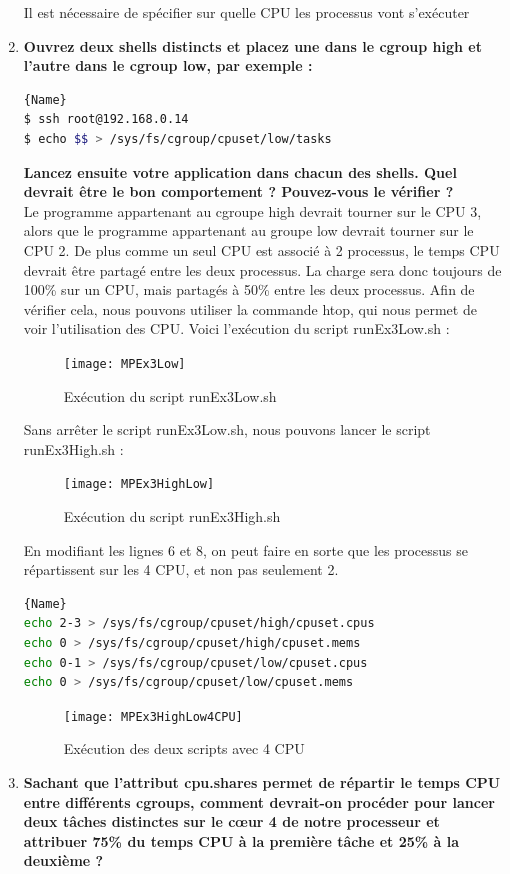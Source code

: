 \documentclass[
	a4paper, %
	10pt, %
]{CSUniSchoolLabReport}
\begin{document}
\begin{enumerate}[label=\textbf{\arabic*}]
	
	Il est n\'ecessaire de sp\'ecifier sur quelle CPU les processus vont s'ex\'ecuter
	\item \textbf{Ouvrez deux shells distincts et placez une dans le cgroup high et l’autre dans le cgroup low, par exemple :}\\
\begin{lstlisting}[language=bash, firstnumber=1]{Name}
$ ssh root@192.168.0.14
$ echo $$ > /sys/fs/cgroup/cpuset/low/tasks
\end{lstlisting}
\textbf{Lancez ensuite votre application dans chacun des shells. Quel devrait être le bon comportement ? Pouvez-vous le vérifier ?}\\
Le programme appartenant au cgroupe high devrait tourner sur le CPU 3, alors que le programme appartenant au groupe low devrait tourner sur le CPU 2.
De plus comme un seul CPU est associé \`a 2 processus, le temps CPU devrait \^etre partagé entre les deux processus. La charge sera donc toujours de 100\% sur un CPU, mais partagés \`a 50\% entre les deux processus.
Afin de v\'erifier cela, nous pouvons utiliser la commande htop, qui nous permet de voir l'utilisation des CPU.
Voici l'ex\'ecution du script runEx3Low.sh :
\begin{figure}[H]
	\centering
	\texttt{[image: MPEx3Low]}
	\caption{Ex\'ecution du script runEx3Low.sh}
	\label{fig:MPEx3Low}
\end{figure}
Sans arr\^eter le script runEx3Low.sh, nous pouvons lancer le script runEx3High.sh :
\begin{figure}[H]
	\centering
	\texttt{[image: MPEx3HighLow]}
	\caption{Ex\'ecution du script runEx3High.sh}
	\label{fig:MPEx3High}
\end{figure}

En modifiant les lignes 6 et 8, on peut faire en sorte que les processus se r\'epartissent sur les 4 CPU, et non pas seulement 2.
\begin{lstlisting}[language=bash, firstnumber=1]{Name}
echo 2-3 > /sys/fs/cgroup/cpuset/high/cpuset.cpus
echo 0 > /sys/fs/cgroup/cpuset/high/cpuset.mems
echo 0-1 > /sys/fs/cgroup/cpuset/low/cpuset.cpus
echo 0 > /sys/fs/cgroup/cpuset/low/cpuset.mems
\end{lstlisting}

\begin{figure}[H]
	\centering
	\texttt{[image: MPEx3HighLow4CPU]}
	\caption{Ex\'ecution des deux scripts avec 4 CPU}
	\label{fig:MPEx3HighLow4CPU}
\end{figure}


	\item \textbf{Sachant que l’attribut cpu.shares permet de répartir le temps CPU entre différents cgroups, comment devrait-on procéder pour lancer deux tâches distinctes sur le cœur 4 de notre processeur et attribuer 75\% du temps CPU à la première tâche et 25\% à la deuxième ?}\\


\end{enumerate}
\end{document}
